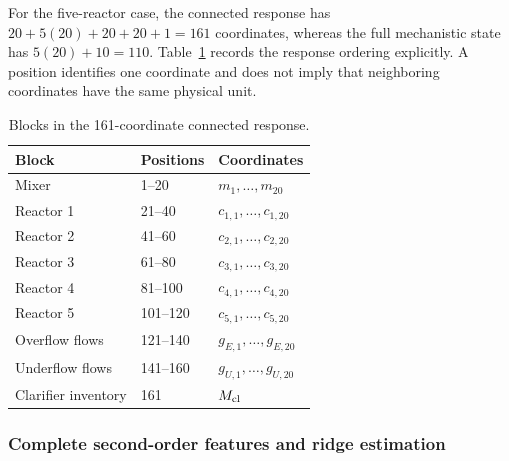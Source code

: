 For the five-reactor case, the connected response has $20+5(20)+20+20+1=161$ coordinates, whereas the full mechanistic state has $5(20)+10=110$. Table~\ref{tab:plant_response_positions} records the response ordering explicitly. A position identifies one coordinate and does not imply that neighboring coordinates have the same physical unit.

\begin{table}[htbp]
\centering\small
\caption{Blocks in the 161-coordinate connected response.}
\label{tab:plant_response_positions}
\begin{tabular}{lll}
\toprule Block & Positions & Coordinates\\\midrule
Mixer & 1--20 & $m_1,\ldots,m_{20}$\\
Reactor 1 & 21--40 & $c_{1,1},\ldots,c_{1,20}$\\
Reactor 2 & 41--60 & $c_{2,1},\ldots,c_{2,20}$\\
Reactor 3 & 61--80 & $c_{3,1},\ldots,c_{3,20}$\\
Reactor 4 & 81--100 & $c_{4,1},\ldots,c_{4,20}$\\
Reactor 5 & 101--120 & $c_{5,1},\ldots,c_{5,20}$\\
Overflow flows & 121--140 & $g_{E,1},\ldots,g_{E,20}$\\
Underflow flows & 141--160 & $g_{U,1},\ldots,g_{U,20}$\\
Clarifier inventory & 161 & $M_{\rm cl}$\\
\bottomrule
\end{tabular}
\end{table}

\subsubsection{Complete second-order features and ridge estimation}

